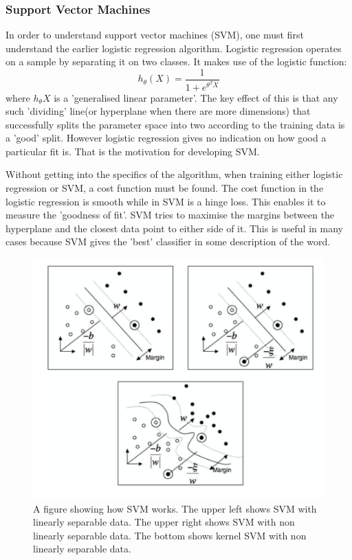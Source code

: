 \documentclass[a4paper,11pt]{article}
\begin{document}
\subsubsection{Support Vector Machines}
In order to understand support vector machines (SVM), one must first understand the earlier logistic regression algorithm. Logistic regression operates on a sample by separating it on two classes. It makes use of the logistic function:
\begin{equation}
h_{\theta}(X)=\frac{1}{1+e^{\theta^{T}X}}
\end{equation}
where $h_\theta X$ is a 'generalised linear parameter'. The key effect of this is that any such 'dividing' line(or hyperplane when there are more dimensions) that successfully splits the parameter space into two according to the training data is a 'good' split. However logistic regression gives no indication on how good a particular fit is. That is the motivation for developing SVM.

Without getting into the specifics of the algorithm, when training either logistic regression or SVM, a cost function must be found. The cost function in the logistic regression is smooth while in SVM is a hinge loss. This enables it to measure the 'goodness of fit'. SVM tries to maximise the margins between the hyperplane and the closest data point to either side of it. This is useful in many cases because SVM gives the 'best' classifier in some description of the word. 
\begin{figure}[ht]
\centering
\includegraphics[width=\textwidth]{SVM.png}
\caption{\label{fig:SVM}A figure showing how SVM works. The upper left shows SVM with linearly separable data. The upper right shows SVM with non linearly separable data. The bottom shows kernel SVM with non linearly separable data.}
\end{figure}
\end{document}

